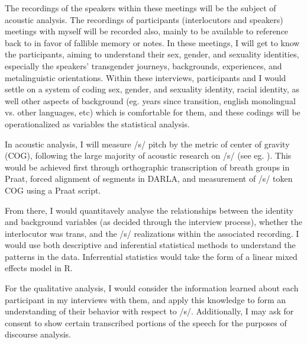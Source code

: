 \documentclass[11pt]{article}
\begin{document}
The recordings of the speakers within these meetings will be the subject of acoustic analysis. The recordings of participants (interlocutors and speakers) meetings with myself will be recorded also, mainly to be available to reference back to in favor of fallible memory or notes. In these meetings, I will get to know the participants, aiming to understand their sex, gender, and sexuality identities, especially the speakers' transgender journeys, backgrounds, experiences, and metalinguistic orientations. Within these interviews, participants and I would settle on a system of coding sex, gender, and sexuality identity, racial identity, as well other aspects of background (eg. years since transition, english monolingual vs. other languages, etc) which is comfortable for them, and these codings will be operationalized as variables the statistical analysis.


In acoustic analysis, I will measure /s/ pitch by the metric of center of gravity (COG), following the large majority of acoustic research on /s/ (see eg. \cite{fuchs_differences_2010, podesva_sexuality_2015, hazenberg_language_2012}). This would be achieved first through orthographic transcription of breath groups in Praat, forced alignment of segments in DARLA, and measurement of  /s/ token COG using a Praat script.

From there, I would quantitavely analyse the relationships between the identity and background variables (as decided through the interview process), whether the interlocutor was trans, and the /s/ realizations within the associated recording. I would use both descriptive and inferential statistical methods to understand the patterns in the data. Inferrential statistics would take the form of a linear mixed effects model in R.

 For the qualitative analysis, I would consider the information learned about each participant in my interviews with them, and apply this knowledge to form an understanding of their behavior with respect to /s/. Additionally, I may ask for consent to show certain transcribed portions of the speech for the purposes of discourse analysis.
\end{document}
